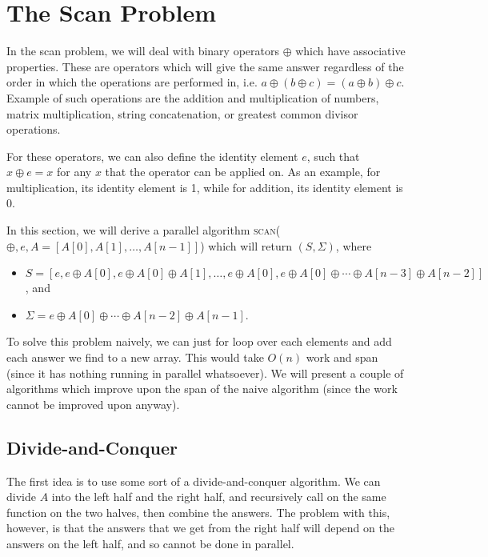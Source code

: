 \documentclass[12pt]{article}
\begin{document}
\MakeScribeTop

\section{The Scan Problem}

In the scan problem, we will deal with binary operators $\oplus$ which have associative properties. These are operators which will give the same answer regardless of the order in which the operations are performed in, i.e. $a\oplus (b \oplus c) = (a \oplus b) \oplus c$. Example of such operations are the addition and multiplication of numbers, matrix multiplication, string concatenation, or greatest common divisor operations.

For these operators, we can also define the identity element $e$, such that $x \oplus e = x$ for any $x$ that the operator can be applied on. As an example, for multiplication, its identity element is 1, while for addition, its identity element is 0.

In this section, we will derive a parallel algorithm \textsc{scan($\oplus, e,A = [A[0], A[1], \ldots, A[n-1]]$)} which will return $(S, \Sigma)$, where
\begin{itemize}
	\item $S = [ e, e \oplus A[0], e \oplus A[0] \oplus A[1], \ldots, e \oplus A[0], e \oplus A[0] \oplus \cdots \oplus A[n-3] \oplus A[n-2] ]$, and
	\item $\Sigma = e \oplus A[0] \oplus \cdots \oplus A[n-2] \oplus A[n-1]$.
\end{itemize}
To solve this problem naively, we can just for loop over each elements and add each answer we find to a new array. This would take $O(n)$ work and span (since it has nothing running in parallel whatsoever). We will present a couple of algorithms which improve upon the span of the naive algorithm (since the work cannot be improved upon anyway).

\subsection{Divide-and-Conquer}

The first idea is to use some sort of a divide-and-conquer algorithm. We can divide $A$ into the left half and the right half, and recursively call on the same function on the two halves, then combine the answers. The problem with this, however, is that the answers that we get from the right half will depend on the answers on the left half, and so cannot be done in parallel. 
\end{document}
